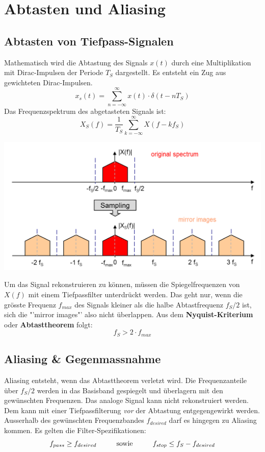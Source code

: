 \section{Abtasten und Aliasing}
\subsection{Abtasten von Tiefpass-Signalen}
Mathematisch wird die Abtastung des Signals $x(t)$ durch eine Multiplikation
mit Dirac-Impulsen der Periode $T_S$ dargestellt. Es entsteht ein Zug aus gewichteten Dirac-Impulsen. 
\[ x_s(t) = \sum_{n=-\infty}^{\infty} x(t) \cdot \delta(t-nT_S) \]
Das Frequenzspektrum des abgetasteten Signals ist:
\[ X_S(f) = \frac{1}{T_S} \sum_{k=-\infty}^{\infty} X(f-kf_S) \]

\begin{center}
	\includegraphics[scale=0.9]{../fig/frequenz_spectrum}
\end{center}
Um das Signal rekonstruieren zu können, müssen die Spiegelfrequenzen von $X(f)$
mit einem Tiefpassfilter unterdrückt werden. Das geht nur, wenn die grösste
Frequenz $f_{max}$ des Signals kleiner als die halbe Abtastfrequenz $f_S/2$ ist, sich die "'mirror images"' also nicht überlappen.
Aus dem \textbf{Nyquist-Kriterium} oder \textbf{Abtasttheorem} folgt:
\[ f_S > 2 \cdot f_{max} \]

\subsection{Aliasing \& Gegenmassnahme}
Aliasing entsteht, wenn das Abtasttheorem verletzt wird. Die Frequenzanteile
über $f_S/2$ werden in das Basisband gespiegelt und überlagern mit den 
gewünschten Frequenzen. Das analoge Signal kann nicht rekonstruiert werden.\\
Dem kann mit einer Tiefpassfilterung \emph{vor} der Abtastung entgegengewirkt werden. Ausserhalb des gewünschten Frequenzbandes $f_{desired}$ darf es hingegen zu Aliasing kommen. Es gelten die Filter-Spezifikationen:
\[ f_{pass} \geq f_{desired} \hspace{10mm} \mathrm{sowie} \hspace{10mm} f_{stop} \leq f_S - f_{desired} \]

